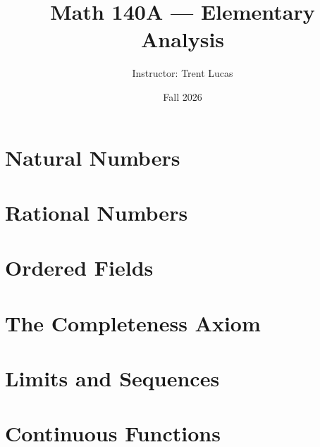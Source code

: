 \documentclass[11pt]{article}
\title{Math 140A --- Elementary Analysis}
\author{Instructor: Trent Lucas}
\date{Fall 2026}
\begin{document}
\maketitle
\tableofcontents
\newpage

\section{Natural Numbers}


\section{Rational Numbers}


\section{Ordered Fields}


\section{The Completeness Axiom}


\section{Limits and Sequences}


\section{Continuous Functions}

\end{document}
